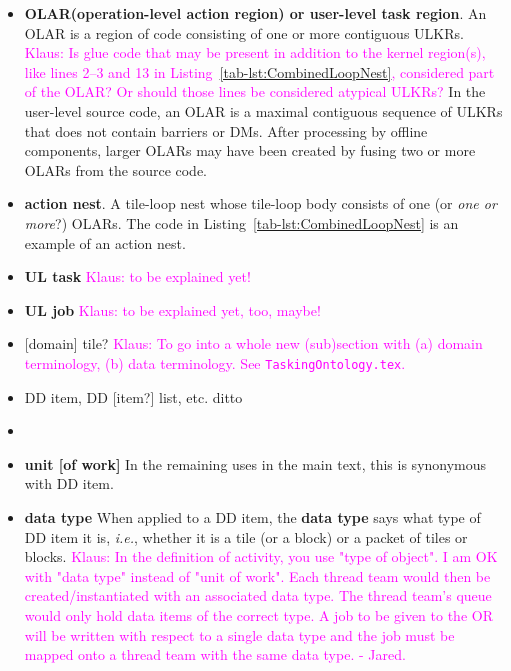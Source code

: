 \documentclass{article}
\newcommand{\ie}{\textit{i.e.}}   %
\newcommand{\etc}{etc.\xspace}  %
\newcommand{\Klaus}[1]          {\textcolor{magenta}{Klaus: #1}}
\newcommand{\KlausRfromJO}[1]   {\textcolor{magenta}{Klaus: #1 - Jared.}}
\newcommand{\spelledoutOLAR}  {operation-level action region\xspace} %
\newcommand{\shortULKRs}  {ULKRs\xspace}
\newcommand{\shortDMs}   {DMs\xspace}
\newcommand{\shortOLAR}  {OLAR\xspace}
\newcommand{\shortOLARs} {OLARs\xspace}
\newcommand{\shortOR}   {OR\xspace}
\newcommand{\ULKRs}  {\shortULKRs}
\newcommand{\DMs}    {\shortDMs}
\newcommand{\OLAR}   {\shortOLAR}             %
\newcommand{\OLARs}  {\shortOLARs}             %
\newcommand{\OR}        {\shortOR}
\newcommand{\tileloop}               {tile loop\xspace}        %
\newcommand{\tileloopnest}           {tile-loop nest\xspace}   %
\newcommand{\tileloopbody}           {tile-loop body\xspace}   %
\newcommand{\actionnest}             {action nest\xspace}      %
\newcommand{\ULtaskreg}             {user-level task region\xspace}  %
\begin{document}
\begin{itemize}
\item \textbf{\OLAR (\spelledoutOLAR) or \ULtaskreg}. An \OLAR is a region of code consisting of one or more
contiguous  \ULKRs. \Klaus{Is glue code that may be present in addition to the
kernel region(s), like lines 2--3 and 13 in Listing~\ref{tab-lst:CombinedLoopNest}, considered part of the \OLAR?
Or should those lines be considered atypical \ULKRs?}
In the user-level source code, an \OLAR is a maximal contiguous sequence of
\ULKRs that does not contain barriers or \DMs.
After processing by offline components, larger \OLARs may have been created
by fusing two or more \OLARs from the source code.

\item \textbf{\actionnest}.
A \tileloopnest whose \tileloopbody consists of one (or \textit{one or more}?) \OLARs.
The code in Listing~\ref{tab-lst:CombinedLoopNest} is an example of an \actionnest.

\item \textbf{UL task} \Klaus{to be explained yet!}
\item \textbf{UL job} \Klaus{to be explained yet, too, maybe!}
\item {[}domain{]} tile? \Klaus{To go into a whole new (sub)section with (a) domain terminology,
(b) data terminology. See \texttt{TaskingOntology.tex}.}
\item {DD item, DD {[}item?{]} list, \etc} ditto
\item
\item \textbf{unit [of work]} In the remaining uses in the main text, this is synonymous with
      DD item.
\item \textbf{data type} When applied to a DD item, the \textbf{data type} says
      what type of DD item it is, \ie, whether it is a tile (or a block)
      or a packet of tiles or blocks.
\KlausRfromJO{In the definition of activity, you use "type of object".  I
am OK with "data type" instead of "unit of work".  Each thread team would then be
created/instantiated with an associated data type.  The thread team's queue
would only hold data items of the correct type.  A job to be given to the \OR
will be written with respect to a single data type and the job must be mapped
onto a thread team with the same data type.}
\end{itemize}
\end{document}

